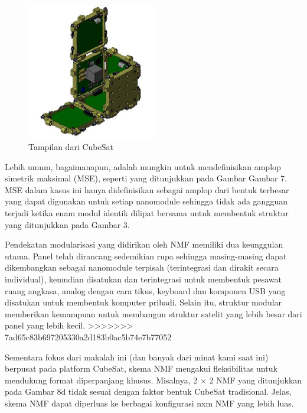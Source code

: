    \begin{figure}[ht]
\centerline{\includegraphics[width=0.5\textwidth]{figures/ViewofCubeSat.png}}
  \caption{Tampilan dari CubeSat}
  \label{ViewofCubeSat}
  \end{figure}

Lebih umum, bagaimanapun, adalah mungkin untuk mendefinisikan amplop simetrik maksimal (MSE), seperti yang ditunjukkan pada Gambar Gambar 7. MSE dalam kasus ini hanya didefinisikan sebagai amplop dari bentuk terbesar yang dapat digunakan untuk setiap nanomodule sehingga tidak ada gangguan terjadi ketika enam modul identik dilipat bersama untuk membentuk struktur yang ditunjukkan pada Gambar 3.

Pendekatan modularisasi yang didirikan oleh NMF memiliki dua keunggulan utama. Panel telah dirancang sedemikian rupa sehingga masing-masing dapat dikembangkan sebagai nanomodule terpisah (terintegrasi dan dirakit secara individual), kemudian disatukan dan terintegrasi untuk membentuk pesawat ruang angkasa, analog dengan cara tikus, keyboard dan komponen USB yang disatukan untuk membentuk komputer pribadi. Selain itu, struktur modular memberikan kemampuan untuk membangun struktur satelit yang lebih besar dari panel yang lebih kecil.
>>>>>>> 7ad65c83b697205330a2d183b0ac5b74e7b77052

Sementara fokus dari makalah ini (dan banyak dari minat kami saat ini) berpusat pada platform CubeSat, skema NMF mengakui fleksibilitas untuk mendukung format diperpanjang khusus. Misalnya, 2 × 2 NMF yang ditunjukkan pada Gambar 8d tidak sesuai dengan faktor bentuk CubeSat tradisional. Jelas, skema NMF dapat diperluas ke berbagai konfigurasi nxm NMF yang lebih luas.